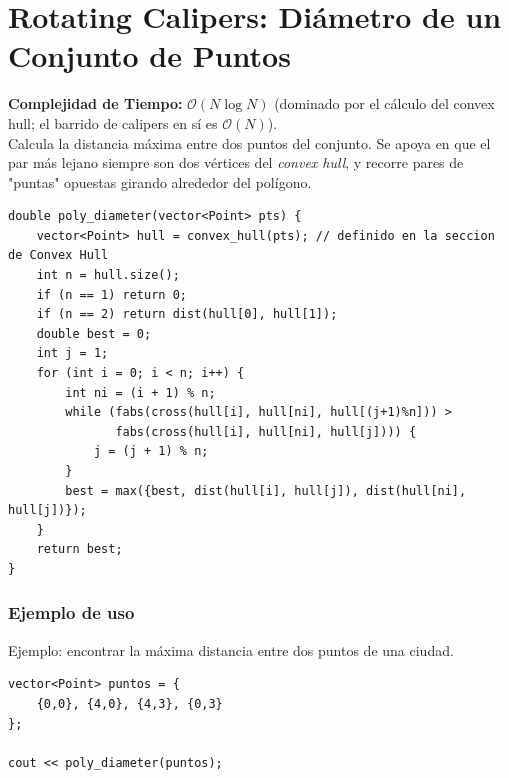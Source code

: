\documentclass[10pt,twocolumn,letterpaper]{report}
\begin{document}
\section{Rotating Calipers: Diámetro de un Conjunto de Puntos}
\textbf{Complejidad de Tiempo:} $\mathcal{O}(N \log N)$ (dominado por el cálculo del convex hull; el barrido de calipers en sí es $\mathcal{O}(N)$). \\
Calcula la distancia máxima entre dos puntos del conjunto. Se apoya en que el par más lejano siempre son dos vértices del \textit{convex hull}, y recorre pares de "puntas" opuestas girando alrededor del polígono.
\begin{lstlisting}
double poly_diameter(vector<Point> pts) {
    vector<Point> hull = convex_hull(pts); // definido en la seccion de Convex Hull
    int n = hull.size();
    if (n == 1) return 0;
    if (n == 2) return dist(hull[0], hull[1]);
    double best = 0;
    int j = 1;
    for (int i = 0; i < n; i++) {
        int ni = (i + 1) % n;
        while (fabs(cross(hull[i], hull[ni], hull[(j+1)%n])) >
               fabs(cross(hull[i], hull[ni], hull[j]))) {
            j = (j + 1) % n;
        }
        best = max({best, dist(hull[i], hull[j]), dist(hull[ni], hull[j])});
    }
    return best;
}
\end{lstlisting}
\subsubsection*{Ejemplo de uso}
Ejemplo: encontrar la máxima distancia entre dos puntos de una ciudad.
\begin{lstlisting}
vector<Point> puntos = {
    {0,0}, {4,0}, {4,3}, {0,3}
};

cout << poly_diameter(puntos);
\end{lstlisting}
\end{document}
